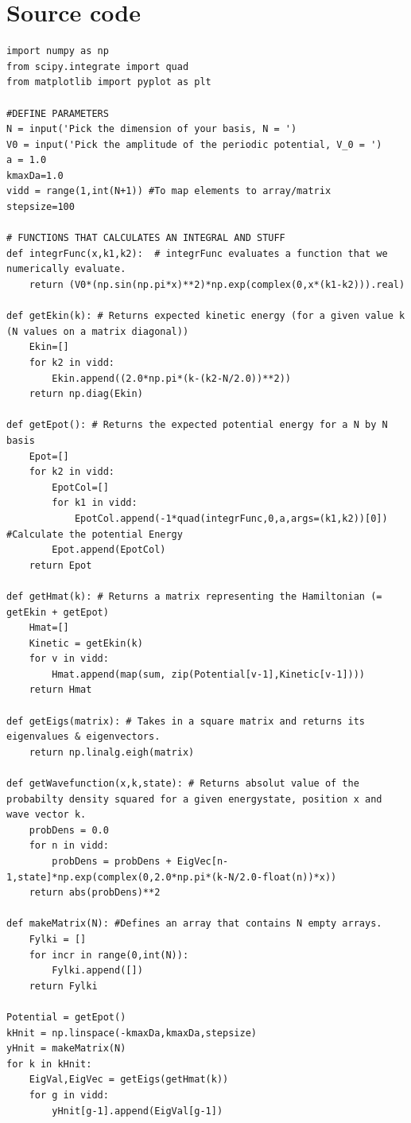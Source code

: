 \documentclass[11pt,a4paper]{article}
\begin{document}
\clearpage
\section*{Source code}
\begin{lstlisting}
import numpy as np
from scipy.integrate import quad
from matplotlib import pyplot as plt

#DEFINE PARAMETERS
N = input('Pick the dimension of your basis, N = ')
V0 = input('Pick the amplitude of the periodic potential, V_0 = ') 
a = 1.0
kmaxDa=1.0
vidd = range(1,int(N+1)) #To map elements to array/matrix
stepsize=100

# FUNCTIONS THAT CALCULATES AN INTEGRAL AND STUFF
def integrFunc(x,k1,k2):  # integrFunc evaluates a function that we numerically evaluate.
    return (V0*(np.sin(np.pi*x)**2)*np.exp(complex(0,x*(k1-k2))).real)

def getEkin(k): # Returns expected kinetic energy (for a given value k (N values on a matrix diagonal))
    Ekin=[]
    for k2 in vidd:
        Ekin.append((2.0*np.pi*(k-(k2-N/2.0))**2))
    return np.diag(Ekin)

def getEpot(): # Returns the expected potential energy for a N by N basis
    Epot=[]
    for k2 in vidd:
        EpotCol=[]
        for k1 in vidd:
            EpotCol.append(-1*quad(integrFunc,0,a,args=(k1,k2))[0]) #Calculate the potential Energy 
        Epot.append(EpotCol)
    return Epot

def getHmat(k): # Returns a matrix representing the Hamiltonian (= getEkin + getEpot)
    Hmat=[]
    Kinetic = getEkin(k)
    for v in vidd:
        Hmat.append(map(sum, zip(Potential[v-1],Kinetic[v-1])))
    return Hmat

def getEigs(matrix): # Takes in a square matrix and returns its eigenvalues & eigenvectors.
    return np.linalg.eigh(matrix)

def getWavefunction(x,k,state): # Returns absolut value of the probabilty density squared for a given energystate, position x and wave vector k.
    probDens = 0.0
    for n in vidd:
        probDens = probDens + EigVec[n-1,state]*np.exp(complex(0,2.0*np.pi*(k-N/2.0-float(n))*x))
    return abs(probDens)**2

def makeMatrix(N): #Defines an array that contains N empty arrays.
    Fylki = []
    for incr in range(0,int(N)):
        Fylki.append([])
    return Fylki

Potential = getEpot()
kHnit = np.linspace(-kmaxDa,kmaxDa,stepsize)
yHnit = makeMatrix(N)
for k in kHnit:
    EigVal,EigVec = getEigs(getHmat(k))
    for g in vidd:
        yHnit[g-1].append(EigVal[g-1])


\end{lstlisting}
\end{document}
